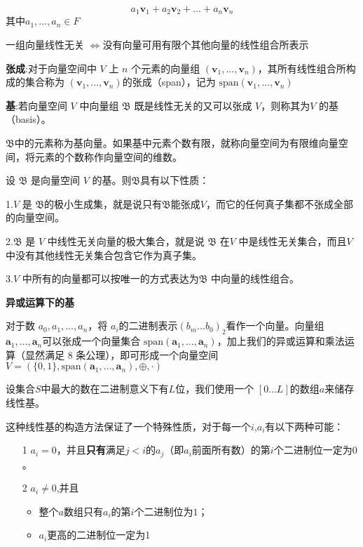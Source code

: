 \documentclass[UTF8]{ctexart}
\begin{document}
$$
a_{1}\mathbf{v}_{1} + a_{2}\mathbf {v} _{2}+\ldots +a_{n}\mathbf {v} _{n}
$$
​​ 
其中$a_1, \ldots, a_n \in F$

一组向量线性无关 $\Leftrightarrow$没有向量可用有限个其他向量的线性组合所表示

\textbf{张成}:对于向量空间中 $V$ 上 $n$ 个元素的向量组 $(\mathbf{v}_1, \ldots, \mathbf{v}_n)$，其所有线性组合所构成的集合称为 $(\mathbf{v}_1, \ldots, \mathbf{v}_n)$的张成（span），记为 $\mathrm{span}(\mathbf{v}_1, \ldots, \mathbf{v}_n)$

\textbf{基}:若向量空间 $V$ 中向量组 $\mathfrak{B}$ 既是线性无关的又可以张成 $V$，则称其为$V$ 的基（basis）。

$\mathfrak{B}$中的元素称为基向量。如果基中元素个数有限，就称向量空间为有限维向量空间，将元素的个数称作向量空间的维数。

设 $\mathfrak {B}$ 是向量空间 $V$ 的基。则$\mathfrak {B}$具有以下性质：

1.$V$ 是 $\mathfrak {B}$的极小生成集，就是说只有$\mathfrak {B}$能张成$V$，而它的任何真子集都不张成全部的向量空间。

2.$\mathfrak {B}$ 是 $V$ 中线性无关向量的极大集合，就是说 $\mathfrak {B}$ 在$V$ 中是线性无关集合，而且$V$ 中没有其他线性无关集合包含它作为真子集。

3.$V$ 中所有的向量都可以按唯一的方式表达为$\mathfrak {B}$ 中向量的线性组合。

\textbf{异或运算下的基}

对于数 $a_0, a_1, \ldots, a_n$，将 $a_i$的二进制表示$ (b_{m}\ldots b_0)_2$​ 看作一个向量。向量组 $\mathbf{a}_1, \ldots, \mathbf{a}_n$可以张成一个向量集合 $\mathrm{span}(\mathbf{a}_1, \ldots, \mathbf{a}_n)$，加上我们的异或运算和乘法运算（显然满足 8 条公理），即可形成一个向量空间 $V = (\{0, 1\}, \mathrm{span}(\mathbf{a}_1, \ldots, \mathbf{a}_n), \oplus, \cdot)$

设集合$S$中最大的数在二进制意义下有$L$位，我们使用一个 $[0\dots L]$的数组$a$来储存线性基。

这种线性基的构造方法保证了一个特殊性质，对于每一个$i$,$a_i$有以下两种可能：
\begin{itemize}
    \item[1] $a_i=0$，并且\textbf{只有}满足$j<i$的$a_j$（即$a_i$前面所有数）的第$i$个二进制位一定为$0$。
    \item[2]  $a_i\neq0$,并且
        \begin{itemize}
            \item 整个$a$数组只有$a_i$的第$i$个二进制位为$1$；
            \item $a_i$更高的二进制位一定为1
        \end{itemize}
\end{itemize}
\end{document}
